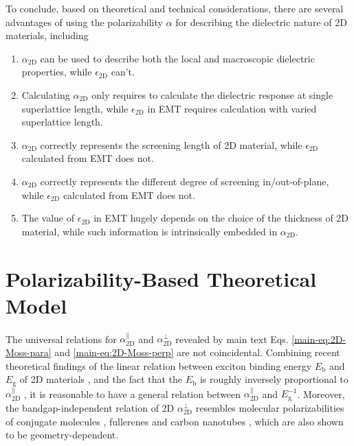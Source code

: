 \documentclass[manuscript=suppinfo,email=true,hyperref=true,keywords=false]{achemso}
\begin{document}
To conclude, based on theoretical and technical considerations, there are several
advantages of using the polarizability $\alpha$ for describing the dielectric
nature of 2D materials, including
\begin{enumerate}
\item $\alpha_{\mathrm{2D}}$ can be used to describe both the local and macroscopic dielectric properties, while $\epsilon_{\mathrm{2D}}$ can't.
\item Calculating $\alpha_{\mathrm{2D}}$ only requires to calculate the dielectric response at single superlattice length, while $\epsilon_{\mathrm{2D}}$ in EMT requires calculation with varied superlattice length.
\item $\alpha_{\mathrm{2D}}$ correctly represents the screening length of 2D material, while $\epsilon_{\mathrm{2D}}$ calculated from EMT does not.
\item $\alpha_{\mathrm{2D}}$ correctly represents the different degree of screening in/out-of-plane, while $\epsilon_{\mathrm{2D}}$ calculated from EMT does not.
  
\item The value of $\epsilon_{\mathrm{2D}}$ in EMT hugely depends on the
  choice of the thickness of 2D material, while such information is
  intrinsically embedded in $\alpha_{\mathrm{2D}}$.
\end{enumerate}


\section{Polarizability-Based Theoretical Model}
\label{sec:theory-1}
The universal relations for $\alpha_{\mathrm{2D}}^{\parallel}$ and
$\alpha_{\mathrm{2D}}^{\perp}$ revealed by main text
Eqs. \ref{main-eq:2D-Moss-para} and \ref{main-eq:2D-Moss-perp} are not
coincidental. Combining recent theoretical findings of the linear
relation between exciton binding energy $E_{\mathrm{b}}$ and
$E_{\mathrm{g}}$ of 2D materials
\cite{Choi_linear_2015,Olsen_2016_hydrogen,Jiang_2017_Eg_Eb}, and the
fact that the $E_{\mathrm{b}}$ is roughly inversely proportional to
$\alpha_{\mathrm{2D}}^{\parallel}$ \cite{Pulci_2014}, it is reasonable
to have a general relation between
$\alpha_{\mathrm{2D}}^{\parallel}$ and $E_{\mathrm{g}}^{-1}$. Moreover,
the bandgap-independent relation of 2D $\alpha_{\mathrm{2D}}^{\perp}$
resembles molecular polarizabilities of conjugate molecules
\cite{Davies_1952}, fullerenes \cite{Sabirov_2014} and carbon
nanotubes \cite{Benedict_1995}, which are also shown to be
geometry-dependent.
\end{document}

